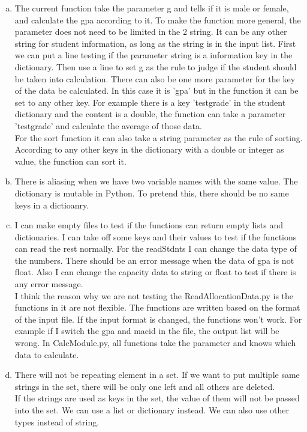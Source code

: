 \documentclass[12pt]{article}
\begin{document}
\begin{enumerate}[(a)]

\item The current function take the parameter g and tells if it is male or female, and calculate the gpa according to it. To make the function more general, the parameter does not need to be limited in the 2 string. It can be any other string for student information, as long as the string is in the input list. First we can put a line testing if the parameter string is a information key in the dictionary. Then use a line to set g as the rule to judge if the student should be taken into calculation. There can also be one more parameter for the key of the data be calculated. In this case it is 'gpa' but in the function it can be set to any other key. For example there is a key 'testgrade' in the student dictionary and the content is a double, the function can take a parameter 'testgrade' and calculate the average of those data.\\
For the sort function it can also take a string parameter as the rule of sorting. According to any other keys in the dictionary with a double or integer as value, the function can sort it.

\item There is aliasing when we have two variable names with the same value. The dictionary is mutable in Python. To pretend this, there should be no same keys in a dictioanry.

\item I can make empty files to test if the functions can return empty lists and dictionaries. I can take off some keys and their values to test if the functions can read the rest normally. For the readStdnts I can change the data type of the numbers. There should be an error message when the data of gpa is not float. Also I can change the capacity data to string or float to test if there is any error message.\\
I think the reason why we are not testing the ReadAllocationData.py is the functions in it are not flexible. The functions are written based on the format of the input file. If the input format is changed, the functions won't work. For example if I switch the gpa and macid in the file, the output list will be wrong. In CalcModule.py, all functions take the parameter and knows which data to calculate.

\item There will not be repeating element in a set. If we want to put multiple same strings in the set, there will be only one left and all others are deleted. \\
If the strings are used as keys in the set, the value of them will not be passed into the set. We can use a list or dictionary instead. We can also use other types instead of string.


\end{enumerate}
\end{document}
